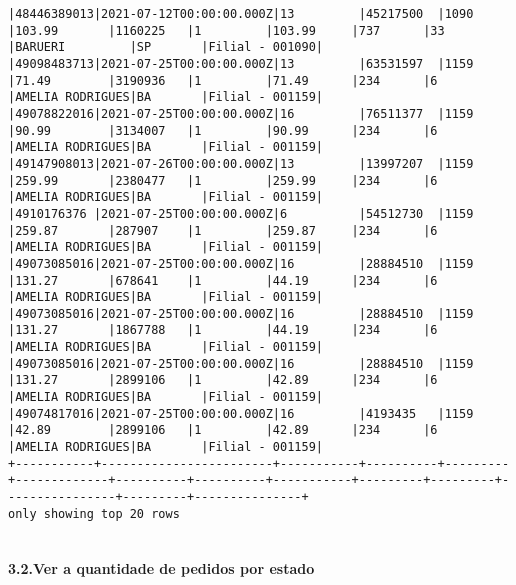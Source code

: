 \documentclass[11pt]{article}
\begin{document}
\begin{Verbatim}[commandchars=\\\{\}]
|48446389013|2021-07-12T00:00:00.000Z|13         |45217500  |1090     |103.99       |1160225   |1         |103.99     |737      |33       |BARUERI         |SP       |Filial - 001090|
|49098483713|2021-07-25T00:00:00.000Z|13         |63531597  |1159     |71.49        |3190936   |1         |71.49      |234      |6        |AMELIA RODRIGUES|BA       |Filial - 001159|
|49078822016|2021-07-25T00:00:00.000Z|16         |76511377  |1159     |90.99        |3134007   |1         |90.99      |234      |6        |AMELIA RODRIGUES|BA       |Filial - 001159|
|49147908013|2021-07-26T00:00:00.000Z|13         |13997207  |1159     |259.99       |2380477   |1         |259.99     |234      |6        |AMELIA RODRIGUES|BA       |Filial - 001159|
|4910176376 |2021-07-25T00:00:00.000Z|6          |54512730  |1159     |259.87       |287907    |1         |259.87     |234      |6        |AMELIA RODRIGUES|BA       |Filial - 001159|
|49073085016|2021-07-25T00:00:00.000Z|16         |28884510  |1159     |131.27       |678641    |1         |44.19      |234      |6        |AMELIA RODRIGUES|BA       |Filial - 001159|
|49073085016|2021-07-25T00:00:00.000Z|16         |28884510  |1159     |131.27       |1867788   |1         |44.19      |234      |6        |AMELIA RODRIGUES|BA       |Filial - 001159|
|49073085016|2021-07-25T00:00:00.000Z|16         |28884510  |1159     |131.27       |2899106   |1         |42.89      |234      |6        |AMELIA RODRIGUES|BA       |Filial - 001159|
|49074817016|2021-07-25T00:00:00.000Z|16         |4193435   |1159     |42.89        |2899106   |1         |42.89      |234      |6        |AMELIA RODRIGUES|BA       |Filial - 001159|
+-----------+------------------------+-----------+----------+---------+-------------+----------+----------+-----------+---------+---------+----------------+---------+---------------+
only showing top 20 rows


    \end{Verbatim}

    \paragraph{3.2.Ver a quantidade de pedidos por
estado}\label{ver-a-quantidade-de-pedidos-por-estado}
\end{document}
